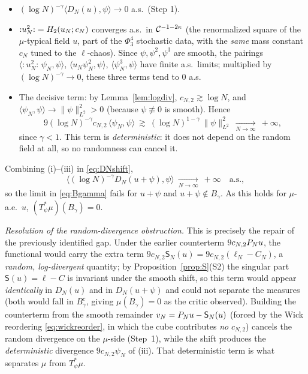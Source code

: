 \begin{itemize}
\item[\rm(i)] $(\log N)^{-\gamma}\langle D_N(u),\psi\rangle\to0$ a.s.\ (Step 1).
\item[\rm(ii)] ${:}u_N^2{:}=H_2(u_N;c_N)$ converges a.s.\ in $\mathcal{C}^{-1-2\kappa}$
(the renormalized square of the $\mu$-typical field $u$, part of the $\Phi^4_3$
stochastic data, with the \emph{same} mass constant $c_N$ tuned to the
$\ell$-chaos). Since $\psi,\psi^2,\psi^3$ are smooth, the pairings
$\langle{:}u_N^2{:}\,\psi_N,\psi\rangle$, $\langle u_N\psi_N^2,\psi\rangle$,
$\langle\psi_N^3,\psi\rangle$ have finite a.s.\ limits; multiplied by
$(\log N)^{-\gamma}\to0$, these three terms tend to $0$ a.s.
\item[\rm(iii)] The decisive term: by Lemma~\ref{lem:logdiv},
$c_{N,2}\gtrsim\log N$, and $\langle\psi_N,\psi\rangle\to\|\psi\|_{L^2}^2>0$
(because $\psi\not\equiv0$ is smooth). Hence
\[
9(\log N)^{-\gamma}c_{N,2}\,\langle\psi_N,\psi\rangle
\ \gtrsim\ (\log N)^{1-\gamma}\,\|\psi\|_{L^2}^2\ \xrightarrow[N\to\infty]{}\ +\infty,
\]
since $\gamma<1$. This term is \emph{deterministic}: it does not depend on the
random field at all, so no randomness can cancel it.
\end{itemize}
Combining (i)--(iii) in \eqref{eq:DNshift},
\[
\bigl\langle(\log N)^{-\gamma}D_N(u+\psi),\psi\bigr\rangle\ \xrightarrow[N\to\infty]{}\ +\infty\quad\text{a.s.},
\]
so the limit in \eqref{eq:Bgamma} fails for $u+\psi$ and $u+\psi\notin B_\gamma$.
As this holds for $\mu$-a.e.\ $u$, $(T_\psi^*\mu)(B_\gamma)=0$.

\smallskip
\noindent\emph{Resolution of the random-divergence obstruction.}
This is precisely the repair of the previously identified gap. Under the earlier
counterterm $9c_{N,2}P_N u$, the functional would carry the extra term
$9c_{N,2}\mathsf S_N(u)=9c_{N,2}(\ell_N-C_N)$, a \emph{random, log-divergent}
quantity; by Proposition~\ref{prop:S}(S2) the singular part $\mathsf S(u)=\ell-C$
is invariant under the smooth shift, so this term would appear \emph{identically}
in $D_N(u)$ and in $D_N(u+\psi)$ and could not separate the measures (both would
fall in $B_\gamma^c$, giving $\mu(B_\gamma)=0$ as the critic observed). Building
the counterterm from the smooth remainder $v_N=P_N u-\mathsf S_N(u)$ (forced by
the Wick reordering \eqref{eq:wickreorder}, in which the cube contributes \emph{no}
$c_{N,2}$) cancels the random divergence on the $\mu$-side (Step~1), while the
shift produces the \emph{deterministic} divergence $9c_{N,2}\psi_N$ of (iii). That
deterministic term is what separates $\mu$ from $T_\psi^*\mu$.

